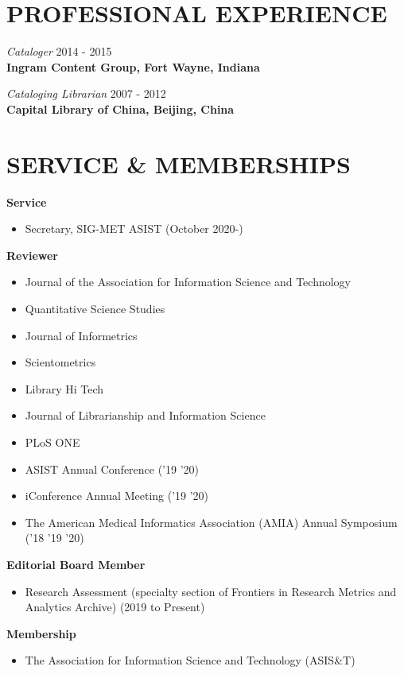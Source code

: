 \documentclass[margin, 10pt]{res} %
\begin{document}
\begin{resume}
\section{PROFESSIONAL EXPERIENCE}

\textit{Cataloger} \hfill 2014 - 2015\\
\textbf{Ingram Content Group, Fort Wayne, Indiana}

\textit{Cataloging Librarian} \hfill 2007 - 2012\\
\textbf{Capital Library of China, Beijing, China}

\section{SERVICE \& MEMBERSHIPS}

\textbf{Service}
\begin{itemize}
\item Secretary, SIG-MET ASIST (October 2020-)
\end{itemize}


\textbf{Reviewer}
\begin{itemize}
\item Journal of the Association for Information Science and Technology
\item Quantitative Science Studies
\item Journal of Informetrics
\item Scientometrics
\item Library Hi Tech
\item Journal of Librarianship and Information Science
\item PLoS ONE
\item ASIST Annual Conference ('19 '20)
\item iConference Annual Meeting ('19 '20)
\item The American Medical Informatics Association (AMIA) Annual Symposium ('18 '19 '20)
\end{itemize}

\textbf{Editorial Board Member}
\begin{itemize}
\item Research Assessment (specialty section of Frontiers in Research Metrics and Analytics Archive) (2019 to Present)
\end{itemize}

\textbf{Membership}
\begin{itemize}
\item The Association for Information Science and Technology (ASIS\&T)
\end{itemize}


\end{resume}
\end{document}
